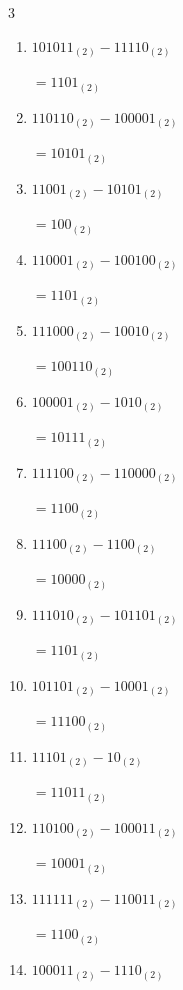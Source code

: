 \begin{multicols}{3}
\begin{enumerate}
        $=10101_{(2)}$

\columnbreak %

\resetques

  \item $101011_{(2)} - 11110_{(2)}$

        $=1101_{(2)}$

  \item $110110_{(2)} - 100001_{(2)}$

        $=10101_{(2)}$

  \item $11001_{(2)} - 10101_{(2)}$

        $=100_{(2)}$

  \item $110001_{(2)} - 100100_{(2)}$

        $=1101_{(2)}$

  \item $111000_{(2)} - 10010_{(2)}$

        $=100110_{(2)}$

  \item $100001_{(2)} - 1010_{(2)}$

        $=10111_{(2)}$

  \item $111100_{(2)} - 110000_{(2)}$

        $=1100_{(2)}$

  \item $11100_{(2)} - 1100_{(2)}$

        $=10000_{(2)}$

  \item $111010_{(2)} - 101101_{(2)}$

        $=1101_{(2)}$

  \item $101101_{(2)} - 10001_{(2)}$

        $=11100_{(2)}$

\columnbreak %

  \item $11101_{(2)} - 10_{(2)}$

        $=11011_{(2)}$

  \item $110100_{(2)} - 100011_{(2)}$

        $=10001_{(2)}$

  \item $111111_{(2)} - 110011_{(2)}$

        $=1100_{(2)}$

  \item $100011_{(2)} - 1110_{(2)}$


\end{enumerate}
\end{multicols}
